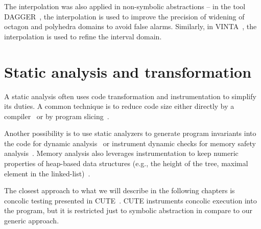 The interpolation was also applied in non-symbolic abstractions -- in the tool
DAGGER~\cite{Gulavani2008}, the interpolation is used to improve the precision
of widening of octagon and polyhedra domains to avoid false alarms. Similarly,
in VINTA~\cite{Albarghouthi2012}, the interpolation is used to refine the interval domain.

\section{Static analysis and transformation}

A static analysis often uses code transformation and instrumentation to
simplify its duties. A common technique is to reduce code size either directly
by a compiler~\cite{Namjoshi2018} or by program slicing~\cite{Chalupa2018}.

Another possibility is to use static analyzers to generate program invariants into the code for dynamic analysis~\cite{Gurfinkel2015} or instrument dynamic checks for memory safety analysis~\cite{Chalupa2019}.
Memory analysis also leverages instrumentation to keep numeric properties of heap-based data structures (e.g., the height of the tree, maximal element in the linked-list)~\cite{Magill2010}.

The closest approach to what we will describe in the following chapters is
concolic testing presented in CUTE~\cite{Sen2005}. CUTE instruments concolic
execution into the program, but it is restricted just to symbolic abstraction
in compare to our generic approach.
